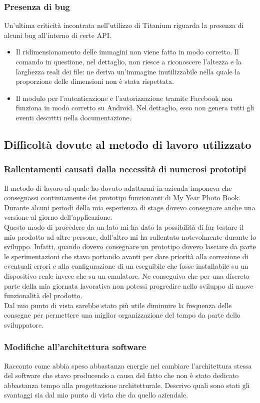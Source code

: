 			\subsubsection{Presenza di bug}
				Un'ultima criticità incontrata nell'utilizzo di Titanium riguarda la presenza di alcuni bug all'interno di certe API.
				\begin{itemize}
					\item Il ridimensionamento delle immagini non viene fatto in modo corretto. Il comando in questione, nel
					dettaglio, non riesce a riconoscere l'altezza e la larghezza reali dei file: ne deriva un'immagine
					inutilizzabile nella quale la proporzione delle dimensioni non è stata rispettata.
					\item Il modulo per l'autenticazione e l'autorizzazione tramite Facebook non funziona in modo corretto su
					Android. Nel dettaglio, esso non genera tutti gli eventi descritti nella documentazione.
				\end{itemize}
		\subsection{Difficoltà dovute al metodo di lavoro utilizzato}
			\subsubsection{Rallentamenti causati dalla necessità di numerosi prototipi}
				Il metodo di lavoro al quale ho dovuto adattarmi in azienda imponeva che consegnassi continuamente dei prototipi
				funzionanti di My Year Photo Book. Durante alcuni periodi della mia esperienza di stage dovevo consegnare anche una
				versione al giorno dell'applicazione.\\
				Questo modo di procedere da un lato mi ha dato la possibilità di far testare il mio prodotto ad altre persone,
				dall'altro mi ha rallentato notevolmente durante lo sviluppo. Infatti, quando dovevo consegnare un prototipo dovevo
				lasciare da parte le sperimentazioni che stavo portando avanti per dare priorità alla correzione di eventuali errori
				e alla configurazione di un eseguibile che fosse installabile su un dispositivo reale invece che su un emulatore. Ne
				conseguiva che per una discreta parte della mia giornata lavorativa non potessi progredire nello sviluppo di nuove
				funzionalità del prodotto.\\
				Dal mio punto di vista sarebbe stato più utile diminuire la frequenza delle consegne per permettere una miglior
				organizzazione del tempo da parte dello sviluppatore.
			\subsubsection{Modifiche all'architettura software}
				Racconto come abbia speso abbastanza energie nel cambiare l'architettura stessa del software che stavo producendo
				a causa del fatto che non è stato dedicato abbastanza tempo alla progettazione architetturale. Descrivo quali sono
				stati gli svantaggi sia dal mio punto di vista che da quello aziendale.
